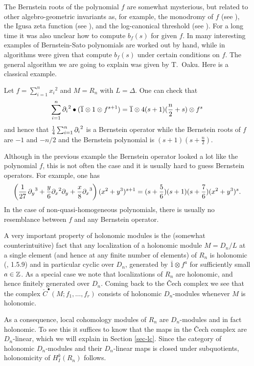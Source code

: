 The Bernstein roots of the polynomial $f$ are somewhat mysterious, but
related to other algebro-geometric invariants as, for example, the
monodromy of $f$ (see \cite{DM:M}), the Igusa zeta function (see \cite{Loeser}), and the log-canonical threshold
(see \cite{DM:Kollar}). For a long time it was also unclear how to
compute $b_f(s)$ for given $f$. In \cite{DM:Yano} many interesting examples of
Bernstein-Sato polynomials are worked out by hand, while in
\cite{DM:AK,DM:Brianconetal,DM:Maisonobe,DM:Satoetal}
algorithms were given that compute $b_f(s)$ under certain conditions
on $f$. The general algorithm we are going to explain was given by
T.\ Oaku.  Here is a classical example.
\begin{example}
Let $f=\sum_{i=1}^n {x_i}^2$ and $M=R_n$ with $L=\Delta$. One can check
that 
\[
\sum_{i=1}^n{\partial_i}^2\bullet(\overline{1}\otimes 1\otimes f^{s+1})=\overline{1}\otimes
4(s+1)(\frac{n}{2}+s)\otimes f^{s}
\]
and hence that 
$\frac{1}{4}\sum_{i=1}^n{\partial_i}^2$ is a Bernstein operator while the
Bernstein roots of $f$ are $-1$ and $-{n}/{2}$ and the Bernstein
polynomial is $(s+1)(s+\frac{n}{2})$.
\end{example}
\begin{example}
Although in the previous example the Bernstein operator looked a lot
like the polynomial $f$, this is not often the case and it is
usually hard to guess Bernstein operators. For example, one has
\[
\left(\frac{1}{27}\,{\partial_y}^3+
\frac{y}{6}{\partial_x}^2\partial_y+\frac{x}{8}{\partial_x}^3\right)(x^2+y^3)^{s+1}=
(s+\frac{5}{6})(s+1)(s+\frac{7}{6}) (x^2+y^3)^s.
\]
In the case of non-quasi-homogeneous polynomials, there is usually no
resemblance between $f$ and any Bernstein operator.
\end{example}
A very important property of holonomic modules is the
(somewhat counterintuitive) fact that any localization of a
holonomic module $M=D_n/L$ at a single element 
(and hence at any finite number
of elements) of $R_n$ is holonomic (\cite{DM:B}, 1.5.9) and 
in particular cyclic over $D_n$, generated by $\bar 1\otimes f^{a}$ for
sufficiently small $a\in {\mathbb Z}$. 
As a
special case we note that 
localizations of $R_n$ are holonomic, and hence finitely generated 
over $D_n$. 
Coming back to the \v Cech complex we see that the complex $\check
C^\bullet(M;f_1,\ldots,f_r)$   
consists of holonomic $D_n$-modules whenever $M$ is holonomic. 

As a consequence, local cohomology modules of $R_n$ are 
$D_n$-modules and in fact holonomic. To see this it 
suffices to know that the maps
in the \v Cech complex are
$D_n$-linear, which we will explain in Section \ref{sec-lc}. 
Since the category 
of holonomic $D_n$-modules and their $D_n$-linear maps
is closed under subquotients,
holonomicity of $H^k_I(R_n)$
follows. 

